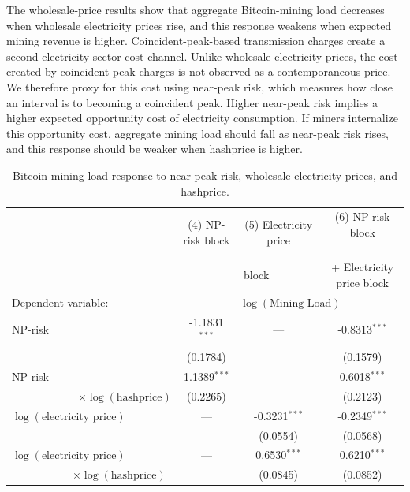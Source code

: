 \documentclass[pdflatex,sn-mathphys-num]{sn-jnl}%
\theoremstyle{thmstyleone}%
\theoremstyle{thmstyletwo}%
\theoremstyle{thmstylethree}%
\begin{document}
The wholesale-price results show that aggregate Bitcoin-mining load decreases when wholesale electricity prices rise, and this response weakens when expected mining revenue is higher. Coincident-peak-based transmission charges create a second electricity-sector cost channel. Unlike wholesale electricity prices, the cost created by coincident-peak charges is not observed as a contemporaneous price. We therefore proxy for this cost using near-peak risk, which measures how close an interval is to becoming a coincident peak. Higher near-peak risk implies a higher expected opportunity cost of electricity consumption. If miners internalize this opportunity cost, aggregate mining load should fall as near-peak risk rises, and this response should be weaker when hashprice is higher.

\begin{table}[!htbp]
\caption{Bitcoin-mining load response to near-peak risk, wholesale electricity prices, and hashprice.}
\label{tab:capacity_elasticity}
\begin{tabular}{@{}lccc@{}}
\toprule
 & (4) NP-risk block & (5) Electricity price  & (6) NP-risk block ~~~~~~~~~~ \\
 &   & block~~~~~~~~        & + Electricity price block \\
\midrule
Dependent variable: & \multicolumn{3}{c}{$\log(\text{Mining Load})$} \\
\midrule

NP-risk   & -1.1831$^{***}$ & --- & -0.8313$^{***}$ \\
                & (0.1784)        &     & (0.1579)        \\[3pt]

NP-risk   & 1.1389$^{***}$ & --- & 0.6018$^{***}$ \\
~~~~~~~~~~~~$\times \log(\text{hashprice})$
                & (0.2265)       &     & (0.2123)        \\[3pt]

$\log(\text{electricity price})$    & --- & -0.3231$^{***}$ & -0.2349$^{***}$ \\
                                    &     & (0.0554)        & (0.0568)        \\[3pt]

$\log(\text{electricity price})$    & --- & 0.6530$^{***}$ & 0.6210$^{***}$ \\
~~~~~~~~~~~$\times \log(\text{hashprice})$
                                    &     & (0.0845)       & (0.0852)        \\[3pt]


\end{tabular}
\end{table}
\end{document}
